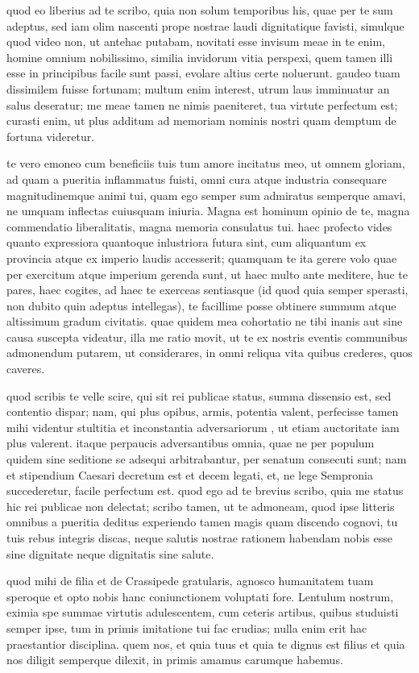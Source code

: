  quod eo liberius ad te scribo, quia non solum temporibus his, quae per te sum adeptus, sed iam olim nascenti prope nostrae laudi dignitatique favisti, simulque quod video non, ut antehac putabam, novitati esse invisum meae in te enim, homine omnium nobilissimo, similia invidorum vitia perspexi, quem tamen illi esse in principibus facile sunt passi, evolare altius certe noluerunt. gaudeo tuam dissimilem fuisse fortunam; multum enim interest, utrum laus imminuatur an salus deseratur; me meae tamen ne nimis paeniteret, tua virtute perfectum est; curasti enim, ut plus additum ad memoriam nominis nostri quam demptum de fortuna videretur.

 te vero emoneo cum beneficiis tuis tum amore incitatus meo, ut omnem gloriam, ad quam a pueritia inflammatus fuisti, omni cura atque industria consequare magnitudinemque animi tui, quam ego semper sum admiratus semperque amavi, ne umquam inflectas cuiusquam iniuria. Magna est hominum opinio de te, magna commendatio liberalitatis, magna memoria consulatus tui. haec profecto vides quanto expressiora quantoque inlustriora futura sint, cum aliquantum ex provincia atque ex imperio laudis accesserit; quamquam te ita gerere volo quae per exercitum atque imperium gerenda sunt, ut haec multo ante meditere, huc te pares, haec cogites, ad haec te exerceas sentiasque (id quod quia semper sperasti, non dubito quin adeptus intellegas), te facillime posse obtinere summum atque altissimum gradum civitatis. quae quidem mea cohortatio ne tibi inanis aut sine causa suscepta videatur, illa me ratio movit, ut te ex nostris eventis communibus admonendum putarem, ut considerares, in omni reliqua vita quibus crederes, quos caveres.

 quod scribis te velle scire, qui sit rei publicae status, summa dissensio est, sed contentio dispar; nam, qui plus opibus, armis, potentia valent, perfecisse tamen mihi videntur stultitia et inconstantia adversariorum , ut etiam auctoritate iam plus valerent. itaque perpaucis adversantibus omnia, quae ne per populum quidem sine seditione se adsequi arbitrabantur, per senatum consecuti sunt; nam et stipendium Caesari decretum est et decem legati, et, ne lege Sempronia succederetur, facile perfectum est. quod ego ad te brevius scribo, quia me status hic rei publicae non delectat; scribo tamen, ut te admoneam, quod ipse litteris omnibus a pueritia deditus experiendo tamen magis quam discendo cognovi, tu tuis rebus integris discas, neque salutis nostrae rationem habendam nobis esse sine dignitate neque dignitatis sine salute.

 quod mihi de filia et de Crassipede gratularis, agnosco humanitatem tuam speroque et opto nobis hanc coniunctionem voluptati fore. Lentulum nostrum, eximia spe summae virtutis adulescentem, cum ceteris artibus, quibus studuisti semper ipse, tum in primis imitatione tui fac erudias; nulla enim erit hac praestantior disciplina. quem nos, et quia tuus et quia te dignus est filius et quia nos diligit semperque dilexit, in primis amamus carumque habemus.

